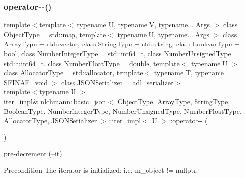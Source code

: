 \subsubsection{\texorpdfstring{operator-\/-\/()}{operator--()}\hspace{0.1cm}{\footnotesize\ttfamily [2/2]}}
{\footnotesize\ttfamily template$<$template$<$ typename U, typename V, typename... Args $>$ class Object\+Type = std\+::map, template$<$ typename U, typename... Args $>$ class Array\+Type = std\+::vector, class String\+Type  = std\+::string, class Boolean\+Type  = bool, class Number\+Integer\+Type  = std\+::int64\+\_\+t, class Number\+Unsigned\+Type  = std\+::uint64\+\_\+t, class Number\+Float\+Type  = double, template$<$ typename U $>$ class Allocator\+Type = std\+::allocator, template$<$ typename T, typename S\+F\+I\+N\+A\+E=void $>$ class J\+S\+O\+N\+Serializer = adl\+\_\+serializer$>$ \\
template$<$typename U $>$ \\
\hyperlink{classnlohmann_1_1basic__json_1_1iter__impl}{iter\+\_\+impl}\& \hyperlink{classnlohmann_1_1basic__json}{nlohmann\+::basic\+\_\+json}$<$ Object\+Type, Array\+Type, String\+Type, Boolean\+Type, Number\+Integer\+Type, Number\+Unsigned\+Type, Number\+Float\+Type, Allocator\+Type, J\+S\+O\+N\+Serializer $>$\+::\hyperlink{classnlohmann_1_1basic__json_1_1iter__impl}{iter\+\_\+impl}$<$ U $>$\+::operator-\/-\/ (\begin{DoxyParamCaption}{ }\end{DoxyParamCaption})\hspace{0.3cm}{\ttfamily [inline]}}



pre-\/decrement (--it) 

\begin{DoxyPrecond}{Precondition}
The iterator is initialized; i.\+e. {\ttfamily m\+\_\+object != nullptr}. 
\end{DoxyPrecond}
\mbox{\label{classnlohmann_1_1basic__json_1_1iter__impl_a9fd84e884e8474c000dc966d331a4854}} 

